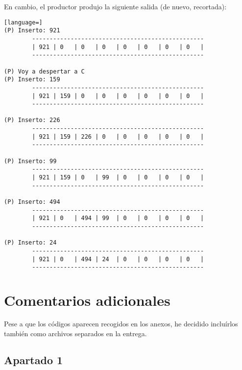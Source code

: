 \documentclass[a4paper]{article}
\begin{document}
En cambio, el productor produjo la siguiente salida (de nuevo, recortada):

\begin{lstlisting}[language=]
(P) Inserto: 921
        -------------------------------------------------
        | 921 | 0   | 0   | 0   | 0   | 0   | 0   | 0   |
        -------------------------------------------------

(P) Voy a despertar a C
(P) Inserto: 159
        -------------------------------------------------
        | 921 | 159 | 0   | 0   | 0   | 0   | 0   | 0   |
        -------------------------------------------------

(P) Inserto: 226
        -------------------------------------------------
        | 921 | 159 | 226 | 0   | 0   | 0   | 0   | 0   |
        -------------------------------------------------

(P) Inserto: 99
        -------------------------------------------------
        | 921 | 159 | 0   | 99  | 0   | 0   | 0   | 0   |
        -------------------------------------------------

(P) Inserto: 494
        -------------------------------------------------
        | 921 | 0   | 494 | 99  | 0   | 0   | 0   | 0   |
        -------------------------------------------------

(P) Inserto: 24
        -------------------------------------------------
        | 921 | 0   | 494 | 24  | 0   | 0   | 0   | 0   |
        -------------------------------------------------
\end{lstlisting}
    
\section{Comentarios adicionales}

Pese a que los códigos aparecen recogidos en los anexos, he decidido incluírlos también como archivos separados en la entrega.
    
\begin{appendices} 
\section{\LARGE \textbf{Apartado 1}}\label{anexo1}

    
\end{appendices}
\end{document}

